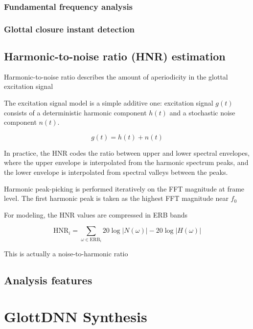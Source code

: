 \documentclass[a4paper, 11pt]{article}
\begin{document}
\subsubsection{Fundamental frequency analysis}

\subsubsection{Glottal closure instant detection}


\subsection{Harmonic-to-noise ratio (HNR) estimation}

Harmonic-to-noise ratio describes the amount of aperiodicity in the glottal excitation signal

The excitation signal model is a simple additive one: excitation signal $g(t)$ consists of a deterministic harmonic component $h(t)$ and a stochastic noise component $n(t)$.

\begin{equation}
g(t) = h(t) + n(t)
\end{equation}

In practice, the HNR codes the ratio between upper and lower spectral envelopes, where the upper envelope is interpolated from the harmonic spectrum peaks, and the lower envelope is interpolated from spectral valleys between the peaks. 

Harmonic peak-picking is performed iteratively on the FFT magnitude at frame level. The first harmonic peak is taken as the highest FFT magnitude near $f_0$ 

For modeling, the HNR values are compressed in ERB bands

\begin{equation}
\mathrm{HNR}_i = \sum_{\omega \in \mathrm{ERB}_i}  20 \log \vert N(\omega) \vert - 20\log \vert H(\omega) \vert
\end{equation}

This is actually a noise-to-harmonic ratio

\subsection{Analysis features}

\section{GlottDNN Synthesis}
\end{document}
